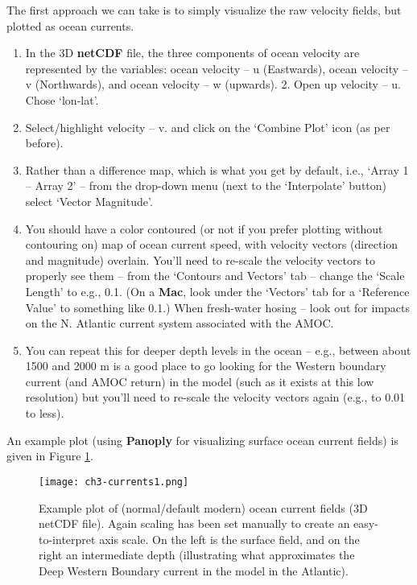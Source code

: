 \noindent The first approach we can take is to simply visualize the raw velocity fields, but plotted as ocean currents.\vspace{1mm}
\begin{enumerate}[noitemsep]
\vspace{1mm}
\item  In the 3D \textbf{netCDF} file, the three components of ocean velocity are represented by the variables: ocean velocity – u (Eastwards), ocean velocity – v (Northwards), and ocean velocity – w (upwards). 2. Open up velocity – u. Chose ‘lon-lat’.
\vspace{1mm}
\item Select/highlight velocity – v. and click on the ‘Combine Plot’ icon (as per before).
\vspace{1mm}
\item Rather than a difference map, which is what you get by default, i.e., ‘Array 1 – Array 2’ – from the drop-down menu (next to the ‘Interpolate’ button) select ‘Vector Magnitude’.
\vspace{1mm}
\item You should have a color contoured (or not if you prefer plotting without contouring on) map of ocean current speed, with velocity vectors (direction and magnitude) overlain. You’ll need to re-scale the velocity vectors to properly see them – from the ‘Contours and Vectors’ tab – change the ‘Scale Length’ to e.g., 0.1. (On a \textbf{Mac}, look under the ‘Vectors’ tab for a ‘Reference Value’ to something like 0.1.)  When fresh-water hosing – look out for impacts on the N. Atlantic current system associated with the AMOC.
\vspace{1mm}
\item You can repeat this for deeper depth levels in the ocean – e.g., between about 1500 and 2000 m is a good place to go looking for the Western boundary current (and AMOC return) in the model (such as it exists at this low resolution) but you’ll need to re-scale the velocity vectors again (e.g., to 0.01 to less).
\end{enumerate}
\vspace{1mm}

\noindent An example plot (using \textbf{Panoply} for visualizing surface ocean current fields) is given in Figure \ref{fig:ch3-currents1}.

\begin{figure}
\texttt{[image: ch3-currents1.png]}\centering
\vspace{-0mm}
\caption{Example plot of (normal/default modern) ocean current fields (3D netCDF file). Again scaling has been set manually to create an easy-to-interpret axis scale. On the left is the surface field, and on the right an intermediate depth (illustrating what approximates the Deep Western Boundary current in the model in the Atlantic).}
\label{fig:ch3-currents1}
\end{figure}

